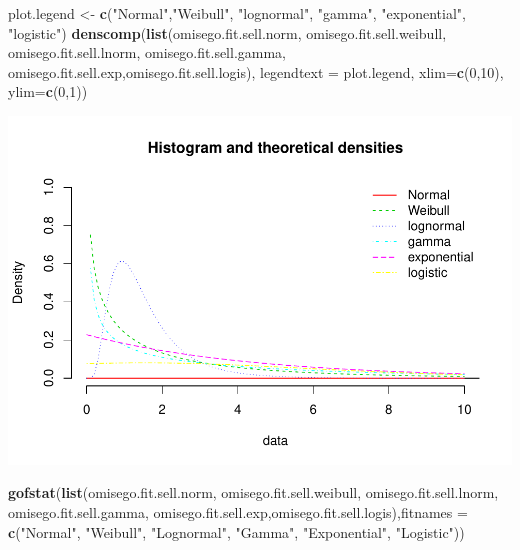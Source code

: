 \documentclass[]{article}
\newenvironment{Shaded}{\begin{snugshade}}{\end{snugshade}}
\newcommand{\KeywordTok}[1]{\textcolor[rgb]{0.13,0.29,0.53}{\textbf{#1}}}
\newcommand{\DataTypeTok}[1]{\textcolor[rgb]{0.13,0.29,0.53}{#1}}
\newcommand{\DecValTok}[1]{\textcolor[rgb]{0.00,0.00,0.81}{#1}}
\newcommand{\StringTok}[1]{\textcolor[rgb]{0.31,0.60,0.02}{#1}}
\newcommand{\NormalTok}[1]{#1}
\begin{document}
\begin{Shaded}
\begin{Highlighting}[]
\NormalTok{plot.legend <-}\StringTok{ }\KeywordTok{c}\NormalTok{(}\StringTok{"Normal"}\NormalTok{,}\StringTok{"Weibull"}\NormalTok{, }\StringTok{"lognormal"}\NormalTok{, }\StringTok{"gamma"}\NormalTok{, }\StringTok{"exponential"}\NormalTok{, }\StringTok{"logistic"}\NormalTok{)}
\KeywordTok{denscomp}\NormalTok{(}\KeywordTok{list}\NormalTok{(omisego.fit.sell.norm, omisego.fit.sell.weibull, omisego.fit.sell.lnorm, omisego.fit.sell.gamma, omisego.fit.sell.exp,omisego.fit.sell.logis), }\DataTypeTok{legendtext =}\NormalTok{ plot.legend, }\DataTypeTok{xlim=}\KeywordTok{c}\NormalTok{(}\DecValTok{0}\NormalTok{,}\DecValTok{10}\NormalTok{), }\DataTypeTok{ylim=}\KeywordTok{c}\NormalTok{(}\DecValTok{0}\NormalTok{,}\DecValTok{1}\NormalTok{))}
\end{Highlighting}
\end{Shaded}

\includegraphics{analysis_files/figure-latex/unnamed-chunk-57-1.pdf}

\begin{Shaded}
\begin{Highlighting}[]
\KeywordTok{gofstat}\NormalTok{(}\KeywordTok{list}\NormalTok{(omisego.fit.sell.norm, omisego.fit.sell.weibull, omisego.fit.sell.lnorm, omisego.fit.sell.gamma, omisego.fit.sell.exp,omisego.fit.sell.logis),}\DataTypeTok{fitnames =} \KeywordTok{c}\NormalTok{(}\StringTok{"Normal"}\NormalTok{, }\StringTok{"Weibull"}\NormalTok{, }\StringTok{"Lognormal"}\NormalTok{, }\StringTok{"Gamma"}\NormalTok{, }\StringTok{"Exponential"}\NormalTok{, }\StringTok{"Logistic"}\NormalTok{))}
\end{Highlighting}
\end{Shaded}
\end{document}
